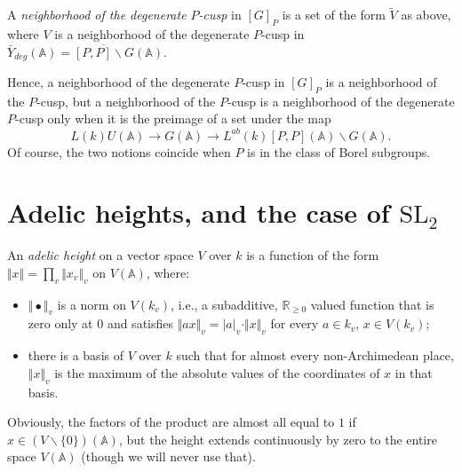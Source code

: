 \begin{definition}
 \label{definition-degenerate-P-cusp}
 A {\it neighborhood of the degenerate $P$-cusp} in $[G]_P$ is a set of the form $\tilde V$ as above, where $V$ is a neighborhood of the degenerate $P$-cusp in $\bar Y_{deg}(\mathbb A) = \overline{[P,P]\backslash G}(\mathbb A)$.
\end{definition}

Hence, a neighborhood of the degenerate $P$-cusp in $[G]_P$ is a neighborhood of the $P$-cusp, but a neighborhood of the $P$-cusp is a neighborhood of the degenerate $P$-cusp only when it is the preimage of a set under the map 
$$ L(k)U(\mathbb A)\to G(\mathbb A) \to L^{ab}(k)[P,P](\mathbb A)\backslash G(\mathbb A).$$
Of course, the two notions coincide when $P$ is in the class of Borel subgroups.

\section{Adelic heights, and the case of $\text{SL}_2$}
\label{section-adelic-heights}


\begin{definition}
 \label{definition-adelic-height}
An \emph{adelic height} on a vector space $V$ over $k$ is a function of the form $\Vert x\Vert = \prod_v \Vert x_v \Vert_v$ on $V(\mathbb A)$, where:
\begin{itemize}
 \item $\Vert \bullet \Vert_v$ is a norm on $V(k_v)$, i.e., a subadditive, $\mathbb R_{\ge 0}$ valued function that is zero only at $0$ and satisfies $\Vert a x \Vert_v = |a|_v \cdot \Vert x \Vert_v$ for every $a\in k_v$, $x\in V(k_v)$;
 \item there is a basis of $V$ over $k$ such that for almost every non-Archimedean place, $\Vert x\Vert_v$ is the maximum of the absolute values of the coordinates of $x$ in that basis.
\end{itemize}
\end{definition}

Obviously, the factors of the product are almost all equal to $1$ if $x\in (V\smallsetminus\{0\})(\mathbb A)$, but the height extends continuously by zero to the entire space $V(\mathbb A)$ (though we will never use that).


